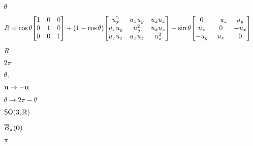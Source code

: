 \documentclass[10pt]{book}
\begin{document}
\begin{mdSnippets}
\begin{mdInlineSnippet}[2554a2bb846cffd697389e5dc8912759]%
$\theta$\end{mdInlineSnippet}%
\begin{mdDisplaySnippet}[1d98412f68004ee8cdcba07da5a6f453]%
\[%
R = \cos\theta \mqty[
1 & 0 & 0 \\
0 & 1 & 0 \\
0 & 0 & 1
]
+ (1 - \cos\theta) \mqty[
u_x^2 & u_x u_y & u_x u_z \\
u_x u_y & u_y^2 & u_x u_z \\
u_x u_z & u_x u_z & u_z^2
]
+ \sin\theta \mqty[
0 & -u_z & u_y \\
u_z & 0 & -u_x \\
-u_y & u_x & 0
]
\]%
\end{mdDisplaySnippet}%
\begin{mdInlineSnippet}[e1e1d3d40573127e9ee0480caf1283d6]%
$R$\end{mdInlineSnippet}%
\begin{mdInlineSnippet}%
$2\pi$\end{mdInlineSnippet}%
\begin{mdInlineSnippet}[5c0e9f2c073d0f5538b3b3540277658b]%
$\theta,$\end{mdInlineSnippet}%
\begin{mdInlineSnippet}[9c0d7a708c1dd13c915ce51b4706890b]%
$\mathbf{u} \to -\mathbf{u}$\end{mdInlineSnippet}%
\begin{mdInlineSnippet}[b1189334ab269cab087e4e391585cd90]%
$\theta \to 2\pi - \theta$\end{mdInlineSnippet}%
\begin{mdInlineSnippet}%
$\mathsf{SO}(3,\mathbb{R})$\end{mdInlineSnippet}%
\begin{mdInlineSnippet}[40a9744fd7bcdbf40c4150ab8fd5e3eb]%
$\overline{B}_\pi(\mathbf{0})$\end{mdInlineSnippet}%
\begin{mdInlineSnippet}%
$\pi$\end{mdInlineSnippet}%
\begin{mdInlineSnippet}[19079f9300ede2ad4931825d38362a9c]%

\end{mdInlineSnippet}
\end{mdSnippets}
\end{document}
